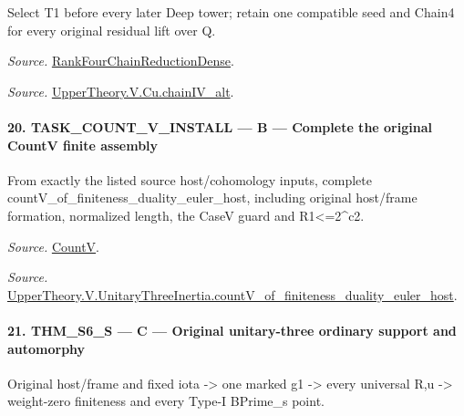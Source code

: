 \documentclass[11pt,a4paper]{article}
\numberwithin{equation}{section}
\theoremstyle{remark}\newtheorem{remark}[theorem]{Remark}
\begin{document}
Select T1 before every later Deep tower; retain one compatible seed and Chain4 for every original residual lift over Q.

\emph{Source.} \href{https://github.com/CocoSgt/riemann-hypothesis-lean/blob/7cbf7a0c32fca1badf05931879a37c3f8a2b03b4/src/Development/AutomorphicArithmetic/AutomorphicVarieties/ModularityArgument/ThresholdArguments/DenseThresholdCases/PromodularityCaseThree.lean#L33-L39}{RankFourChainReductionDense}.

\emph{Source.} \href{https://github.com/CocoSgt/riemann-hypothesis-lean/blob/7cbf7a0c32fca1badf05931879a37c3f8a2b03b4/src/Development/AutomorphicArithmetic/AutomorphicVarieties/ModularityArgument/ThresholdArguments/DenseThresholdCases/CuPChainIV.lean#L16-L82}{UpperTheory.V.Cu.chainIV\_\allowbreak alt}.



\paragraph{20. TASK\_\allowbreak COUNT\_\allowbreak V\_\allowbreak INSTALL — B — Complete the original CountV finite assembly}

From exactly the listed source host/cohomology inputs, complete countV\_\allowbreak of\_\allowbreak finiteness\_\allowbreak duality\_\allowbreak euler\_\allowbreak host, including original host/frame formation, normalized length, the CaseV guard and R1<=2\textasciicircum{}c2.

\emph{Source.} \href{https://github.com/CocoSgt/riemann-hypothesis-lean/blob/7cbf7a0c32fca1badf05931879a37c3f8a2b03b4/src/Development/AutomorphicArithmetic/AutomorphicVarieties/HeightAndVanishing/Counts.lean#L69-L69}{CountV}.

\emph{Source.} \href{https://github.com/CocoSgt/riemann-hypothesis-lean/blob/7cbf7a0c32fca1badf05931879a37c3f8a2b03b4/src/Development/AutomorphicArithmetic/AutomorphicVarieties/ModularityArgument/ThresholdArguments/DenseThresholdCases/CountVOf.lean#L33-L60}{UpperTheory.V.UnitaryThreeInertia.countV\_\allowbreak of\_\allowbreak finiteness\_\allowbreak duality\_\allowbreak euler\_\allowbreak host}.



\paragraph{21. THM\_\allowbreak S6\_\allowbreak S — C — Original unitary-three ordinary support and automorphy}

Original host/frame and fixed iota -> one marked g1 -> every universal R,u -> weight-zero finiteness and every Type-I BPrime\_\allowbreak s point.
\end{document}
